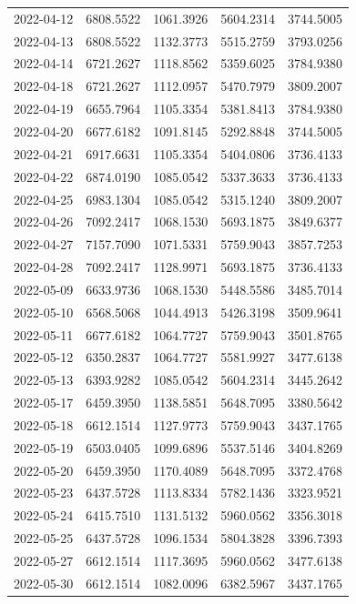 {\begin{longtable}{lllll}
2022-04-12 & 6808.5522 & 1061.3926 & 5604.2314 & 3744.5005 \\
2022-04-13 & 6808.5522 & 1132.3773 & 5515.2759 & 3793.0256 \\
2022-04-14 & 6721.2627 & 1118.8562 & 5359.6025 & 3784.9380 \\
2022-04-18 & 6721.2627 & 1112.0957 & 5470.7979 & 3809.2007 \\
2022-04-19 & 6655.7964 & 1105.3354 & 5381.8413 & 3784.9380 \\
2022-04-20 & 6677.6182 & 1091.8145 & 5292.8848 & 3744.5005 \\
2022-04-21 & 6917.6631 & 1105.3354 & 5404.0806 & 3736.4133 \\
2022-04-22 & 6874.0190 & 1085.0542 & 5337.3633 & 3736.4133 \\
2022-04-25 & 6983.1304 & 1085.0542 & 5315.1240 & 3809.2007 \\
2022-04-26 & 7092.2417 & 1068.1530 & 5693.1875 & 3849.6377 \\
2022-04-27 & 7157.7090 & 1071.5331 & 5759.9043 & 3857.7253 \\
2022-04-28 & 7092.2417 & 1128.9971 & 5693.1875 & 3736.4133 \\
2022-05-09 & 6633.9736 & 1068.1530 & 5448.5586 & 3485.7014 \\
2022-05-10 & 6568.5068 & 1044.4913 & 5426.3198 & 3509.9641 \\
2022-05-11 & 6677.6182 & 1064.7727 & 5759.9043 & 3501.8765 \\
2022-05-12 & 6350.2837 & 1064.7727 & 5581.9927 & 3477.6138 \\
2022-05-13 & 6393.9282 & 1085.0542 & 5604.2314 & 3445.2642 \\
2022-05-17 & 6459.3950 & 1138.5851 & 5648.7095 & 3380.5642 \\
2022-05-18 & 6612.1514 & 1127.9773 & 5759.9043 & 3437.1765 \\
2022-05-19 & 6503.0405 & 1099.6896 & 5537.5146 & 3404.8269 \\
2022-05-20 & 6459.3950 & 1170.4089 & 5648.7095 & 3372.4768 \\
2022-05-23 & 6437.5728 & 1113.8334 & 5782.1436 & 3323.9521 \\
2022-05-24 & 6415.7510 & 1131.5132 & 5960.0562 & 3356.3018 \\
2022-05-25 & 6437.5728 & 1096.1534 & 5804.3828 & 3396.7393 \\
2022-05-27 & 6612.1514 & 1117.3695 & 5960.0562 & 3477.6138 \\
2022-05-30 & 6612.1514 & 1082.0096 & 6382.5967 & 3437.1765 \\

\end{longtable}}
